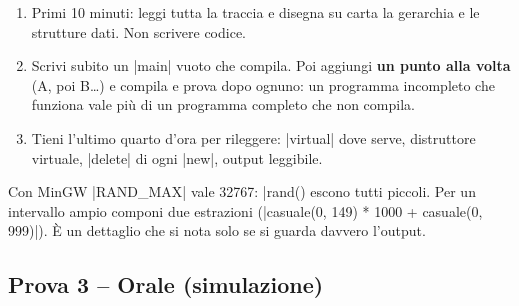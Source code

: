 \begin{consiglio}
\begin{enumerate}
  \item Primi 10 minuti: leggi tutta la traccia e disegna su carta la gerarchia e le
        strutture dati. Non scrivere codice.
  \item Scrivi subito un \cc|main| vuoto che compila. Poi aggiungi \textbf{un punto alla
        volta} (A, poi B\ldots) e compila e prova dopo ognuno: un programma incompleto che
        funziona vale più di un programma completo che non compila.
  \item Tieni l'ultimo quarto d'ora per rileggere: \cc|virtual| dove serve, distruttore
        virtuale, \cc|delete| di ogni \cc|new|, output leggibile.
\end{enumerate}
\end{consiglio}

\begin{trappola}
Con MinGW \cc|RAND_MAX| vale 32767: \cc|rand() %
 escono tutti piccoli. Per un intervallo ampio componi due estrazioni
(\cc|casuale(0, 149) * 1000 + casuale(0, 999)|). È un dettaglio che si nota solo se si
guarda davvero l'output.
\end{trappola}

\subsection*{Prova 3 -- Orale (simulazione)}

